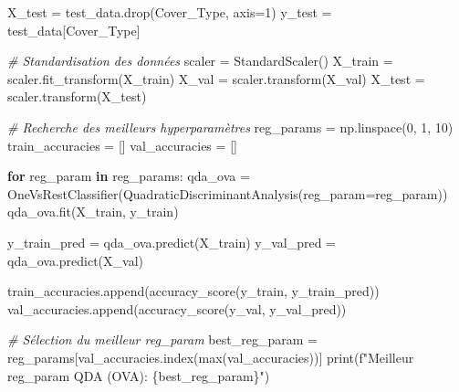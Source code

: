 \documentclass[
  letterpaper,
  DIV=11,
  numbers=noendperiod]{scrartcl}
\newenvironment{Shaded}{}{}
\newcommand{\BuiltInTok}[1]{\textcolor[rgb]{0.00,0.50,0.00}{#1}}
\newcommand{\CommentTok}[1]{\textcolor[rgb]{0.38,0.63,0.69}{\textit{#1}}}
\newcommand{\ControlFlowTok}[1]{\textcolor[rgb]{0.00,0.44,0.13}{\textbf{#1}}}
\newcommand{\DecValTok}[1]{\textcolor[rgb]{0.25,0.63,0.44}{#1}}
\newcommand{\KeywordTok}[1]{\textcolor[rgb]{0.00,0.44,0.13}{\textbf{#1}}}
\newcommand{\NormalTok}[1]{#1}
\newcommand{\OperatorTok}[1]{\textcolor[rgb]{0.40,0.40,0.40}{#1}}
\newcommand{\SpecialCharTok}[1]{\textcolor[rgb]{0.25,0.44,0.63}{#1}}
\newcommand{\SpecialStringTok}[1]{\textcolor[rgb]{0.73,0.40,0.53}{#1}}
\newcommand{\StringTok}[1]{\textcolor[rgb]{0.25,0.44,0.63}{#1}}
\begin{document}
\begin{Shaded}
\begin{Highlighting}[]
\NormalTok{X\_test }\OperatorTok{=}\NormalTok{ test\_data.drop(}\StringTok{\textquotesingle{}Cover\_Type\textquotesingle{}}\NormalTok{, axis}\OperatorTok{=}\DecValTok{1}\NormalTok{)}
\NormalTok{y\_test }\OperatorTok{=}\NormalTok{ test\_data[}\StringTok{\textquotesingle{}Cover\_Type\textquotesingle{}}\NormalTok{]}

\CommentTok{\# Standardisation des données}
\NormalTok{scaler }\OperatorTok{=}\NormalTok{ StandardScaler()}
\NormalTok{X\_train }\OperatorTok{=}\NormalTok{ scaler.fit\_transform(X\_train)}
\NormalTok{X\_val }\OperatorTok{=}\NormalTok{ scaler.transform(X\_val)}
\NormalTok{X\_test }\OperatorTok{=}\NormalTok{ scaler.transform(X\_test)}

\CommentTok{\# Recherche des meilleurs hyperparamètres}
\NormalTok{reg\_params }\OperatorTok{=}\NormalTok{ np.linspace(}\DecValTok{0}\NormalTok{, }\DecValTok{1}\NormalTok{, }\DecValTok{10}\NormalTok{)}
\NormalTok{train\_accuracies }\OperatorTok{=}\NormalTok{ []}
\NormalTok{val\_accuracies }\OperatorTok{=}\NormalTok{ []}

\ControlFlowTok{for}\NormalTok{ reg\_param }\KeywordTok{in}\NormalTok{ reg\_params:}
\NormalTok{    qda\_ova }\OperatorTok{=}\NormalTok{ OneVsRestClassifier(QuadraticDiscriminantAnalysis(reg\_param}\OperatorTok{=}\NormalTok{reg\_param))}
\NormalTok{    qda\_ova.fit(X\_train, y\_train)}
    
\NormalTok{    y\_train\_pred }\OperatorTok{=}\NormalTok{ qda\_ova.predict(X\_train)}
\NormalTok{    y\_val\_pred }\OperatorTok{=}\NormalTok{ qda\_ova.predict(X\_val)}
    
\NormalTok{    train\_accuracies.append(accuracy\_score(y\_train, y\_train\_pred))}
\NormalTok{    val\_accuracies.append(accuracy\_score(y\_val, y\_val\_pred))}

\CommentTok{\# Sélection du meilleur reg\_param}
\NormalTok{best\_reg\_param }\OperatorTok{=}\NormalTok{ reg\_params[val\_accuracies.index(}\BuiltInTok{max}\NormalTok{(val\_accuracies))]}
\BuiltInTok{print}\NormalTok{(}\SpecialStringTok{f"Meilleur reg\_param QDA (OVA): }\SpecialCharTok{\{}\NormalTok{best\_reg\_param}\SpecialCharTok{\}}\SpecialStringTok{"}\NormalTok{)}


\end{Highlighting}
\end{Shaded}
\end{document}
